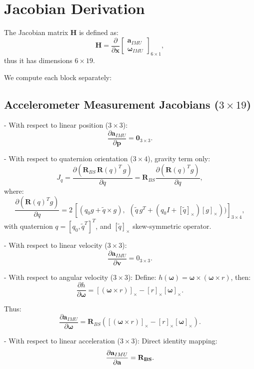 \documentclass{article}
\begin{document}
	\vspace*{10pt}

	\section*{Jacobian Derivation}

	The Jacobian matrix $\mathbf{H}$ is defined as:
	$$
	\mathbf{H} =
	\frac{\partial}{\partial \mathbf{x}}
	\begin{bmatrix}
		\mathbf{a}_{IMU}\\[6pt]
		\boldsymbol{\omega}_{IMU}
	\end{bmatrix}_{6\times1},
	$$
	thus it has dimensions $6\times19$.

	We compute each block separately:

	\vspace*{10pt}

	\subsection*{Accelerometer Measurement Jacobians ($3\times19$)}

	- With respect to linear position ($3\times3$):
	$$
	\frac{\partial \mathbf{a}_{IMU}}{\partial \mathbf{p}} =
	\mathbf{0}_{3\times3}.
	$$

	- With respect to quaternion orientation ($3\times4$), gravity term only:
	$$
	J_q = \frac{\partial (\mathbf{R}_{BS}\,\mathbf R(q)^T\, g)}{\partial q} =
	\mathbf{R}_{BS}\frac{\partial (\mathbf R(q)^T g)}{\partial q},
	$$
	where:
	$$
	\frac{\partial (\mathbf R(q)^T g)}{\partial q}=2\,[
	(q_0 g + \tilde q\times g),~~(\tilde q\,g^T+(q_0 I+[\tilde q]_\times)[g]_\times))]
	_{3\times4},
	$$
	with quaternion $q=[q_0,\tilde q^T]^T$, and $[\tilde q]_\times$ skew-symmetric operator.

	- With respect to linear velocity ($3\times3$):
	$$
	\frac{\partial \mathbf a_{IMU}}{\partial \mathbf v}=0_{3\times 3}.
	$$

	- With respect to angular velocity ($3\times3$):
	Define: $h(\boldsymbol{\omega})=\boldsymbol{\omega}\times(\boldsymbol{\omega}\times r)$,
	then:
	$$
	\frac{\partial h}{\partial \boldsymbol{\omega}}=[(\boldsymbol{\omega}\times r)]_\times-[r]_\times[\boldsymbol{\omega}]_\times.
	$$

	Thus:
	$$
	\frac{\partial \mathbf a_{IMU}}{\partial {\boldsymbol {\omega}} }=\mathbf R_{BS}\left([(\boldsymbol{\omega}\times r)]_\times-[r]_\times[\boldsymbol{\omega}]_\times\right).
	$$

	- With respect to linear acceleration ($3\times3$):
	Direct identity mapping:
	$$
	\frac{\partial {\bf a}_{IMU}}{\partial {\bf a}}=\bf R_{BS}.
	$$
\end{document}

